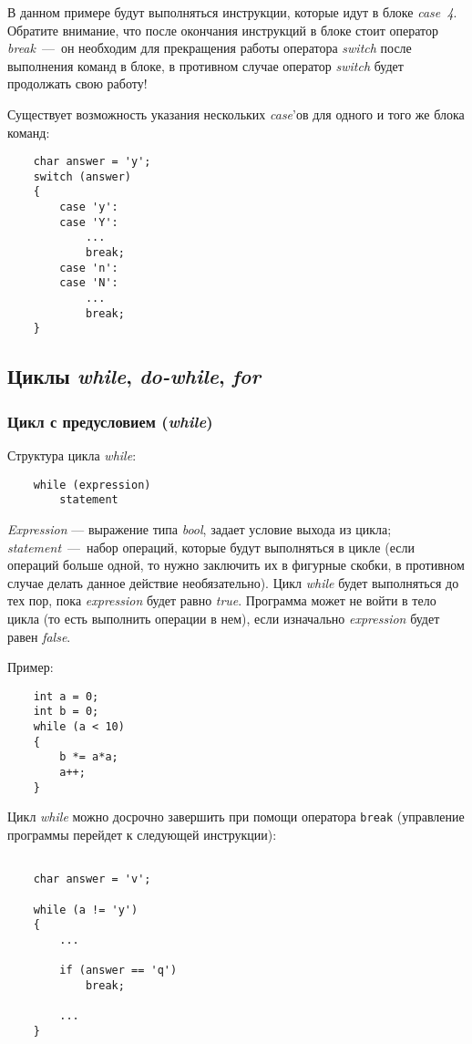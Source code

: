 В данном примере будут выполняться инструкции, которые идут в блоке \textit{case~4}. Обратите внимание, что после окончания инструкций в блоке стоит оператор \textit{break}~---~он необходим для прекращения работы оператора \textit{switch} после выполнения команд в блоке, в противном случае оператор \textit{switch} будет продолжать свою работу!

Существует возможность указания нескольких \textit{case}'ов для одного и того же блока команд:

\begin{lstlisting}
    char answer = 'y';
    switch (answer)
    {
        case 'y':
        case 'Y':
            ...
            break;
        case 'n':
        case 'N':
            ...
            break;
    }
\end{lstlisting}

\subsection{Циклы \textit{while}, \textit{do-while}, \textit{for}}
\subsubsection{Цикл с предусловием (\textit{while})}
Структура цикла \textit{while}:
\begin{lstlisting}
    while (expression)
        statement
\end{lstlisting}

\textit{Expression} --- выражение типа \textit{bool}, задает условие выхода из цикла; \textit{statement}~---~набор операций, которые будут выполняться в цикле (если операций больше одной, то нужно заключить их в фигурные скобки, в противном случае делать данное действие необязательно). Цикл \textit{while} будет выполняться до тех пор, пока \textit{expression} будет равно \textit{true}. Программа может не войти в тело цикла (то есть выполнить операции в нем), если изначально \textit{expression} будет равен \textit{false}.

Пример:

\begin{lstlisting}
    int a = 0;
    int b = 0;
    while (a < 10)
    {
        b *= a*a;
        a++;
    }
\end{lstlisting}

Цикл \textit{while} можно досрочно завершить при помощи оператора \lstinline$break$ (управление программы перейдет к следующей инструкции):

\begin{lstlisting}

    char answer = 'v';

    while (a != 'y')
    {
        ...

        if (answer == 'q')
            break;

        ...
    }

\end{lstlisting}

